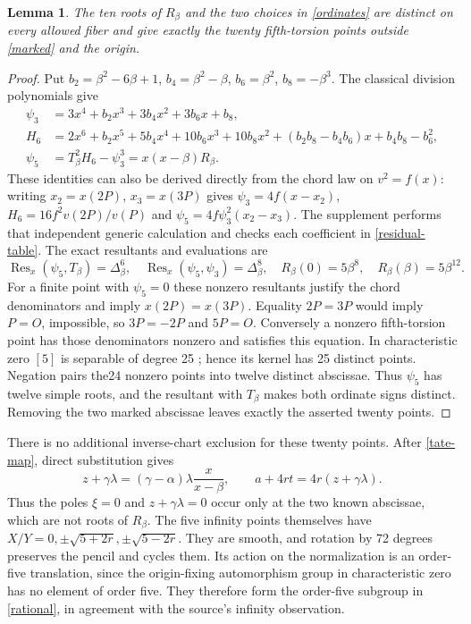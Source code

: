 \documentclass[11pt]{article}
\newtheorem{lemma}{Lemma}
\newcommand{\Res}{\operatorname{Res}}
\begin{document}
\begin{lemma}\label{complete}
The ten roots of $R_\beta$ and the two choices in \eqref{ordinates}
are distinct on every allowed fiber and give exactly the twenty
fifth-torsion points outside \eqref{marked} and the origin.
\end{lemma}
\begin{proof}
Put $b_2=\beta^2-6\beta+1$, $b_4=\beta^2-\beta$, $b_6=\beta^2$,
$b_8=-\beta^3$. The classical division polynomials give
\begin{align*}
\psi_3&=3x^4+b_2x^3+3b_4x^2+3b_6x+b_8,\\
H_6&=2x^6+b_2x^5+5b_4x^4+10b_6x^3+10b_8x^2
 +(b_2b_8-b_4b_6)x+b_4b_8-b_6^2,\\
\psi_5&=T_\beta^2H_6-\psi_3^3=x(x-\beta)R_\beta.
\end{align*}
These identities can also be derived directly from the chord law on
$v^2=f(x)$: writing $x_2=x(2P)$, $x_3=x(3P)$ gives
$\psi_3=4f(x-x_2)$, $H_6=16f^2v(2P)/v(P)$ and
$\psi_5=4f\psi_3^2(x_2-x_3)$. The supplement performs that independent
generic calculation and checks each coefficient in \eqref{residual-table}.
The exact resultants and evaluations are
\[
\Res_x(\psi_5,T_\beta)=\Delta_\beta^6,\quad
\Res_x(\psi_5,\psi_3)=\Delta_\beta^8,\quad
R_\beta(0)=5\beta^8,\quad R_\beta(\beta)=5\beta^{12}.
\]
For a finite point with $\psi_5=0$ these nonzero resultants justify
the chord denominators and imply $x(2P)=x(3P)$. Equality $2P=3P$
would imply $P=O$, impossible, so $3P=-2P$ and $5P=O$.
Conversely a nonzero fifth-torsion point has those denominators nonzero
and satisfies this equation. In characteristic zero $[5]$ is separable
of degree 25 \cite[sections 5.5--5.6]{sutherland}; hence its kernel has
25 distinct points. Negation pairs the24 nonzero points into twelve
distinct abscissae. Thus $\psi_5$ has twelve simple roots, and the
resultant with $T_\beta$ makes both ordinate signs distinct. Removing
the two marked abscissae leaves exactly the asserted twenty points.
\end{proof}

There is no additional inverse-chart exclusion for these twenty points.
After \eqref{tate-map}, direct substitution gives
\[
z+\gamma\lambda=(\gamma-\alpha)\lambda\frac{x}{x-\beta},
\qquad a+4rt=4r(z+\gamma\lambda).
\]
Thus the poles $\xi=0$ and $z+\gamma\lambda=0$ occur only at the two
known abscissae, which are not roots of $R_\beta$. The five infinity
points themselves have $X/Y=0,\pm\sqrt{5+2r},\pm\sqrt{5-2r}$.
They are smooth, and rotation by 72 degrees preserves the pencil and
cycles them. Its action on the normalization is an order-five
translation, since the origin-fixing automorphism group in
characteristic zero has no element of order five. They therefore form
the order-five subgroup in \eqref{rational}, in agreement with the
source's infinity observation.
\end{document}
